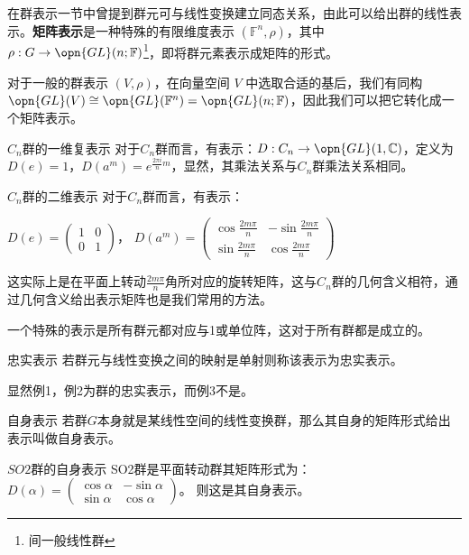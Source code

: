 

在群表示一节中曾提到群元可与线性变换建立同态关系，由此可以给出群的线性表示。\textbf{矩阵表示}是一种特殊的有限维度表示 $(\mathbb{F}^n, \rho)$，其中 $\rho: G \to \opn{GL}(n; \mathbb{F})$\footnote{间一般线性群}，即将群元素表示成矩阵的形式。

对于一般的群表示 $(V, \rho)$，在向量空间 $V$ 中选取合适的基后，我们有同构 $\opn{GL}(V) \cong \opn{GL}(\mathbb{F}^n) = \opn{GL}(n; \mathbb{F})$，因此我们可以把它转化成一个矩阵表示。

\begin{example}{$C_n$群的一维复表示}
对于$C_n$群而言，有表示：$D: C_n \to \opn{GL}(1, \mathbb{C})$，定义为$D(e)=1$，$D(a^m)=e^{\frac{2\pi i}{n}m}$，显然，其乘法关系与$C_n$群乘法关系相同。
\label{gprep_ex1}
\end{example}

\begin{example}{$C_n$群的二维表示}
对于$C_n$群而言，有表示：

$D(e)=\begin{pmatrix}
 1 & 0\\
 0 &1
\end{pmatrix}$，
$D(a^m)=\begin{pmatrix}
 \cos{\frac{2m\pi}{n}} & -\sin{\frac{2m\pi}{n}}\\
 \sin{\frac{2m\pi}{n}} &\cos{\frac{2m\pi}{n}}
\end{pmatrix}$

这实际上是在平面上转动$\frac{2m\pi}{n}$角所对应的旋转矩阵，这与$C_n$群的几何含义相符，通过几何含义给出表示矩阵也是我们常用的方法。
\end{example}

\begin{example}{}
一个特殊的表示是所有群元都对应与1或单位阵，这对于所有群都是成立的。
\label{gprep_ex3}
\end{example}

\begin{definition}{忠实表示}
若群元与线性变换之间的映射是单射则称该表示为忠实表示。
\end{definition}

显然例1，例2为群的忠实表示，而例3不是。

\begin{definition}{自身表示}
若群$G$本身就是某线性空间的线性变换群，那么其自身的矩阵形式给出表示叫做自身表示。
\end{definition}
\begin{example}{$SO2$群的自身表示}
SO2群是平面转动群其矩阵形式为：$D(\alpha)=\begin{pmatrix}
 \cos{\alpha} & -\sin{\alpha}\\
 \sin{\alpha} & \cos{\alpha}
\end{pmatrix}$。
则这是其自身表示。
\end{example}

